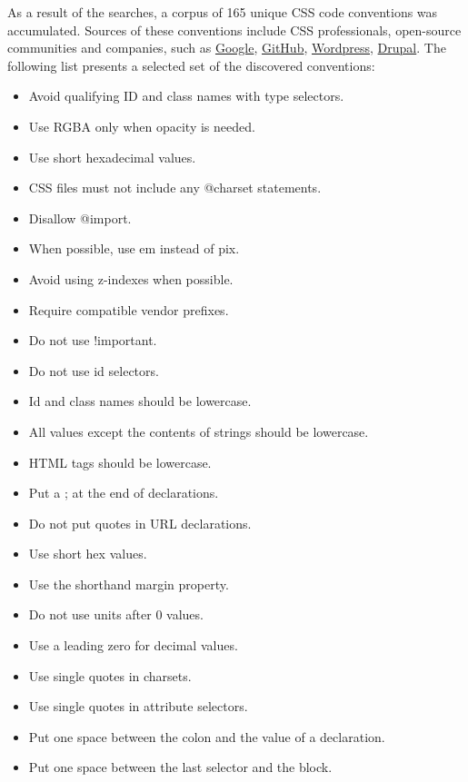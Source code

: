 \documentclass[parskip=full]{uvamscse}
\begin{document}
As a result of the searches, a corpus of 165 unique CSS code conventions was accumulated. Sources
of these conventions include CSS professionals, open-source communities and companies, such as \href{https://google-styleguide.googlecode.com/svn/trunk/htmlcssguide.xml#Protocol}{Google}, \href{http://primercss.io/guidelines/#css}{GitHub}, \href{https://make.wordpress.org/core/handbook/best-practices/coding-standards/css/}{Wordpress}, \href{https://www.drupal.org/node/1887862}{Drupal}. The following list presents a selected set of the discovered conventions:

\begin{itemize} 
\item Avoid qualifying ID and class names with type selectors. 
\item Use RGBA only when opacity is needed.
\item Use short hexadecimal values. 
\item CSS files must not include any @charset statements.
\item Disallow @import. 
\item When possible, use em instead of pix. 
\item Avoid using z-indexes when possible. 
\item Require compatible vendor prefixes. 
\item Do not use !important. 
\item Do not use id selectors. 
\item Id and class names should be lowercase.
\item All values except the contents of strings should be lowercase.  
\item HTML tags should be lowercase.
\item Put a ; at the end of declarations. 
\item Do not put quotes in URL declarations.
\item Use short hex values.
\item Use the shorthand margin property.
\item Do not use units after 0 values.
\item Use a leading zero for decimal values.
\item Use single quotes in charsets.
\item Use single quotes in attribute selectors.
\item Put one space between the colon and the value of a declaration.
\item Put one space between the last selector and the block.

\end{itemize}
\end{document}

